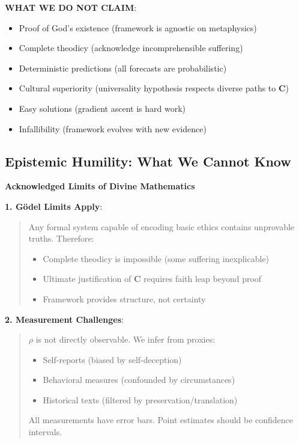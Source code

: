 \documentclass[11pt,a4paper]{article}
\theoremstyle{definition}
\theoremstyle{remark}
\begin{document}
\begin{enumerate}
\begin{protocol}
\begin{mdframed}[backgroundcolor=yellow!10,linewidth=2pt]
\textbf{WHAT WE DO NOT CLAIM}:
\begin{itemize}[nosep]
    \item Proof of God's existence (framework is agnostic on metaphysics)
    \item Complete theodicy (acknowledge incomprehensible suffering)
    \item Deterministic predictions (all forecasts are probabilistic)
    \item Cultural superiority (universality hypothesis respects diverse paths to \(\mathbf{C}\))
    \item Easy solutions (gradient ascent is hard work)
    \item Infallibility (framework evolves with new evidence)
\end{itemize}
\end{mdframed}

\subsection{Epistemic Humility: What We Cannot Know}

\begin{mdframed}[backgroundcolor=red!10,linewidth=2pt]
\textbf{Acknowledged Limits of Divine Mathematics}

\textbf{1. Gödel Limits Apply}:
\begin{quote}
Any formal system capable of encoding basic ethics contains unprovable truths. Therefore:
\begin{itemize}[nosep]
    \item Complete theodicy is impossible (some suffering inexplicable)
    \item Ultimate justification of \(\mathbf{C}\) requires faith leap beyond proof
    \item Framework provides structure, not certainty
\end{itemize}
\end{quote}

\textbf{2. Measurement Challenges}:
\begin{quote}
\(\rho\) is not directly observable. We infer from proxies:
\begin{itemize}[nosep]
    \item Self-reports (biased by self-deception)
    \item Behavioral measures (confounded by circumstances)
    \item Historical texts (filtered by preservation/translation)
\end{itemize}
All measurements have error bars. Point estimates should be confidence intervals.
\end{quote}


\end{mdframed}
\end{protocol}
\end{enumerate}
\end{document}
